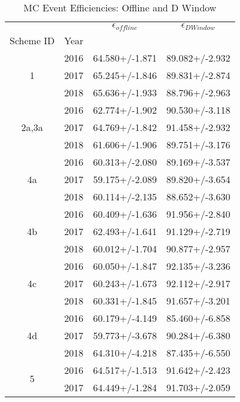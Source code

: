 \begin{table}
\centering
\caption{MC Event Efficiencies: Offline and D Window}
\label{tab:event_offdwin_1}
\begin{tabular}{cccc}
\toprule
   &      & $\epsilon_{offline}$ & $\epsilon_{D Window}$ \\
Scheme ID & Year &                      &                       \\
\midrule
\multirow{3}{*}{1} & 2016 &       64.580+/-1.871 &        89.082+/-2.932 \\
   & 2017 &       65.245+/-1.846 &        89.831+/-2.874 \\
   & 2018 &       65.636+/-1.933 &        88.796+/-2.963 \\
\cline{1-4}
\multirow{3}{*}{2a,3a} & 2016 &       62.774+/-1.902 &        90.530+/-3.118 \\
   & 2017 &       64.769+/-1.842 &        91.458+/-2.932 \\
   & 2018 &       61.606+/-1.906 &        89.751+/-3.176 \\
\cline{1-4}
\multirow{3}{*}{4a} & 2016 &       60.313+/-2.080 &        89.169+/-3.537 \\
   & 2017 &       59.175+/-2.089 &        89.820+/-3.654 \\
   & 2018 &       60.114+/-2.135 &        88.652+/-3.630 \\
\cline{1-4}
\multirow{3}{*}{4b} & 2016 &       60.409+/-1.636 &        91.956+/-2.840 \\
   & 2017 &       62.493+/-1.641 &        91.129+/-2.719 \\
   & 2018 &       60.012+/-1.704 &        90.877+/-2.957 \\
\cline{1-4}
\multirow{3}{*}{4c} & 2016 &       60.050+/-1.847 &        92.135+/-3.236 \\
   & 2017 &       60.243+/-1.673 &        92.112+/-2.917 \\
   & 2018 &       60.331+/-1.845 &        91.657+/-3.201 \\
\cline{1-4}
\multirow{3}{*}{4d} & 2016 &       60.179+/-4.149 &        85.460+/-6.858 \\
   & 2017 &       59.773+/-3.678 &        90.284+/-6.380 \\
   & 2018 &       64.310+/-4.218 &        87.435+/-6.550 \\
\cline{1-4}
\multirow{3}{*}{5} & 2016 &       64.517+/-1.513 &        91.642+/-2.423 \\
   & 2017 &       64.449+/-1.284 &        91.703+/-2.059 \\

\end{tabular}
\end{table}
